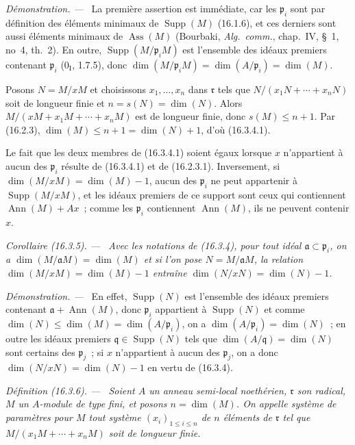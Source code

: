 \documentclass[10pt,oneside]{book}
\makeatletter
\newcommand{\setmanualcurrentlabel}[1]{\def\@currentlabel{#1}}
\newcommand{\oldpage}[2][]{%
  \setcounter{footnote}{0}%
  \marginpar{\scriptsize\textbf{#1}~|~#2}\ignorespaces}
\newenvironment{definition}[1][]{%
  \setmanualcurrentlabel{#1}\par\medskip\noindent\itshape Définition (#1). ---\ }{\par}
\newenvironment{corollary}[1][]{%
  \setmanualcurrentlabel{#1}\par\medskip\noindent\itshape Corollaire (#1). ---\ }{\par}
\newenvironment{proof}{%
  \par\medskip\noindent\textit{Démonstration. ---\ }}{\par}
\makeatother
\begin{document}
\begin{proof}
La première assertion est immédiate, car les $\mathfrak{p}_i$ sont par
définition des éléments minimaux de $\operatorname{Supp}(M)$ (16.1.6), et ces
derniers sont aussi éléments minimaux de $\operatorname{Ass}(M)$ (Bourbaki,
\emph{Alg.~comm.}, chap.~IV, \S~1, no~4, th.~2). En outre,
$\operatorname{Supp}(M/\mathfrak{p}_iM)$ est l'ensemble des idéaux premiers
contenant $\mathfrak{p}_i$ ($0_{\mathrm I}$, 1.7.5), donc
$\dim(M/\mathfrak{p}_iM)=\dim(A/\mathfrak{p}_i)=\dim(M)$.

Posons $N=M/xM$ et choisissons $x_1,\ldots,x_n$ dans $\mathfrak{r}$ tels
que $N/(x_1N+\cdots+x_nN)$ soit de longueur finie et $n=s(N)=\dim(N)$.
Alors $M/(xM+x_1M+\cdots+x_nM)$ est de longueur finie, donc $s(M)\leq n+1$.
Par (16.2.3), $\dim(M)\leq n+1=\dim(N)+1$, d'où (16.3.4.1).

Le fait que les deux membres de (16.3.4.1) soient égaux lorsque $x$
n'appartient à aucun des $\mathfrak{p}_i$ résulte de (16.3.4.1) et de
(16.2.3.1). Inversement, si
\oldpage[0\textsubscript{IV-1}]{30}
$\dim(M/xM)=\dim(M)-1$, aucun des $\mathfrak{p}_i$ ne peut appartenir à
$\operatorname{Supp}(M/xM)$, et les idéaux premiers de ce support sont ceux
qui contiennent $\operatorname{Ann}(M)+Ax$~; comme les $\mathfrak{p}_i$
contiennent $\operatorname{Ann}(M)$, ils ne peuvent contenir $x$.
\end{proof}

\begin{corollary}[16.3.5]
\label{0.16.3.5-fr}
Avec les notations de (16.3.4), pour tout idéal
$\mathfrak{a}\subset\mathfrak{p}_i$, on a
$\dim(M/\mathfrak{a}M)=\dim(M)$ et si l'on pose
$N=M/\mathfrak{a}M$, la relation $\dim(M/xM)=\dim(M)-1$ entraîne
$\dim(N/xN)=\dim(N)-1$.
\end{corollary}

\begin{proof}
En effet, $\operatorname{Supp}(N)$ est l'ensemble des idéaux premiers
contenant $\mathfrak{a}+\operatorname{Ann}(M)$, donc $\mathfrak{p}_i$
appartient à $\operatorname{Supp}(N)$ et comme
$\dim(N)\leq\dim(M)=\dim(A/\mathfrak{p}_i)$, on a
$\dim(A/\mathfrak{p}_i)=\dim(N)$~; en outre les idéaux premiers
$\mathfrak{q}\in\operatorname{Supp}(N)$ tels que
$\dim(A/\mathfrak{q})=\dim(N)$ sont certains des $\mathfrak{p}_j$~; si $x$
n'appartient à aucun des $\mathfrak{p}_j$, on a donc
$\dim(N/xN)=\dim(N)-1$ en vertu de (16.3.4).
\end{proof}

\begin{definition}[16.3.6]
\label{0.16.3.6-fr}
Soient $A$ un anneau semi-local noethérien, $\mathfrak{r}$ son radical, $M$ un
$A$-module de type fini, et posons $n=\dim(M)$. On appelle \emph{système de
paramètres pour $M$} tout système $(x_i)_{1\leq i\leq n}$ de $n$ éléments de
$\mathfrak{r}$ tel que $M/(x_1M+\cdots+x_nM)$ soit de longueur finie.
\end{definition}
\end{document}
